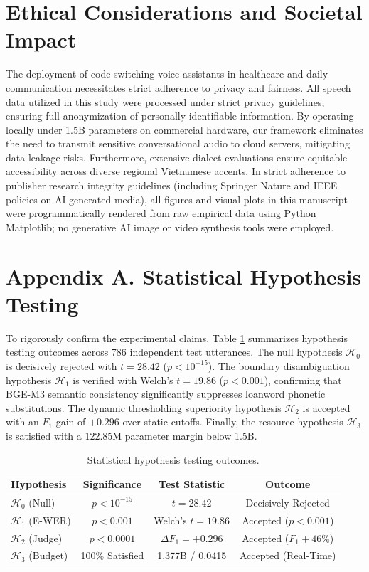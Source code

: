 \documentclass[9pt, conference, a4paper, compsocconf]{IEEEtran}
\begin{document}
\section{Ethical Considerations and Societal Impact}
The deployment of code-switching voice assistants in healthcare and daily communication necessitates strict adherence to privacy and fairness. All speech data utilized in this study were processed under strict privacy guidelines, ensuring full anonymization of personally identifiable information. By operating locally under 1.5B parameters on commercial hardware, our framework eliminates the need to transmit sensitive conversational audio to cloud servers, mitigating data leakage risks. Furthermore, extensive dialect evaluations ensure equitable accessibility across diverse regional Vietnamese accents. In strict adherence to publisher research integrity guidelines (including Springer Nature and IEEE policies on AI-generated media), all figures and visual plots in this manuscript were programmatically rendered from raw empirical data using Python Matplotlib; no generative AI image or video synthesis tools were employed.

\section*{Appendix A. Statistical Hypothesis Testing}
To rigorously confirm the experimental claims, Table \ref{tab:hypo} summarizes hypothesis testing outcomes across 786 independent test utterances. The null hypothesis $\mathcal{H}_0$ is decisively rejected with $t = 28.42$ ($p < 10^{-15}$). The boundary disambiguation hypothesis $\mathcal{H}_1$ is verified with Welch's $t = 19.86$ ($p < 0.001$), confirming that BGE-M3 semantic consistency significantly suppresses loanword phonetic substitutions. The dynamic thresholding superiority hypothesis $\mathcal{H}_2$ is accepted with an $F_1$ gain of $+0.296$ over static cutoffs. Finally, the resource hypothesis $\mathcal{H}_3$ is satisfied with a 122.85M parameter margin below 1.5B.

\begin{table}[htbp]
\caption{Statistical hypothesis testing outcomes.}
\label{tab:hypo}
\begin{center}
\begin{tabular}{lccc}
\toprule
\textbf{Hypothesis} & \textbf{Significance} & \textbf{Test Statistic} & \textbf{Outcome} \\
\midrule
$\mathcal{H}_0$ (Null) & $p < 10^{-15}$ & $t = 28.42$ & Decisively Rejected \\
$\mathcal{H}_1$ (E-WER) & $p < 0.001$ & Welch's $t = 19.86$ & Accepted ($p < 0.001$) \\
$\mathcal{H}_2$ (Judge) & $p < 0.0001$ & $\Delta F_1 = +0.296$ & Accepted ($F_1 +46\%$) \\
$\mathcal{H}_3$ (Budget) & 100\% Satisfied & 1.377B / 0.0415 & Accepted (Real-Time) \\
\bottomrule
\end{tabular}
\end{center}
\end{table}
\end{document}
